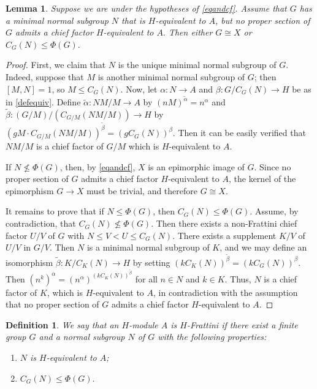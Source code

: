 \documentclass[10pt,a4paper]{amsart}
\newtheorem{lemma}[thm]{Lemma}
\newtheorem{definition}[thm]{Definition}
\begin{document}
\begin{lemma}\label{preparo} Suppose we are under the hypotheses of \cref{eqandcf}. Assume that $G$ has a minimal normal subgroup $N$ that is $H$-equivalent to $A$, but no proper section of $G$ admits a chief factor $H$-equivalent to $A.$
Then either $G\cong X$ or $C_G(N)\leq \Phi(G).$
\end{lemma}
\begin{proof}
	First, we claim that $N$ is the unique minimal normal subgroup of $G$. Indeed, suppose that $M$ is another minimal normal subgroup of $G$; then $[M,N]=1$, so $M \leq C_G(N)$. Now, let $\alpha\colon N \to A$ and $\beta: G/C_G(N) \to H$ be as in \cref{defequiv}. Define $\tilde{\alpha}\colon NM/M \to A$ by $(nM)^{\tilde{\alpha}} = n^\alpha$ and $\tilde{\beta}\colon (G/M)/(C_{G/M}(NM/M)) \to H$ by $(gM\cdot C_{G/M}(NM/M))^{\tilde{\beta}} = (gC_G(N))^\beta$. Then it can be easily verified that $NM/M$ is a chief factor of $G/M$ which is $H$-equivalent to $A$.
	
If $N \not\leq \Phi(G)$, then, by \cref{eqandcf}, $X$ is an epimorphic image of $G$. Since no proper section of $G$ admits a chief factor $H$-equivalent to $A$, the kernel of the epimorphism $G \to X$ must be trivial, and therefore $G \cong X$.


It remains to prove that if $N \leq \Phi(G)$, then $C_G(N) \leq \Phi(G)$.
Assume, by contradiction, that $C_G(N) \not\leq \Phi(G)$. Then there exists a non-Frattini chief factor $U/V$ of $G$ with $N \leq V < U \leq C_G(N)$. There exists a supplement $K/V$ of $U/V$ in $G/V$. Then $N$ is a minimal normal subgroup of $K$, and we may define an isomorphism $\tilde{\beta}\colon  K/C_K(N) \to H$ by setting $(kC_K(N))^{\tilde{\beta}} = (kC_G(N))^\beta$. Then $(n^k)^\alpha = (n^\alpha)^{(kC_K(N))^{\tilde{\beta}}}$ for all $n \in N$ and $k \in K$. Thus, $N$ is a chief factor of $K$, which is $H$-equivalent to $A$, in contradiction with the assumption that no proper section of $G$ admits a chief factor $H$-equivalent to $A$.
\end{proof}


\begin{definition}\label{frath}We say that an $H$-module $A$ is \emph{$H$-Frattini} if there exist a finite group $G$ and a normal subgroup $N$ of $G$ with the following properties:
\begin{enumerate}
\item $N$ is $H$-equivalent to $A$;
\item $C_G(N)\leq \Phi(G).$
\end{enumerate}
\end{definition}
\end{document}
